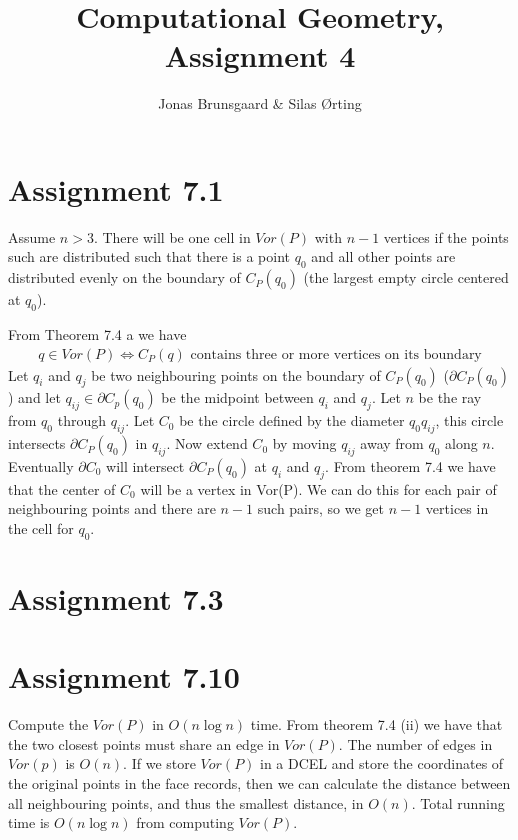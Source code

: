 \documentclass[10pt,a4paper,final,oneside,openany,article,oldfontcommands]{memoir}
\title{Computational Geometry, Assignment 4}
\author{
    Jonas Brunsgaard \& Silas Ørting
}
\begin{document}
\maketitle


\chapter*{Assignment 7.1}
Assume $n > 3$. There will be one cell in $Vor(P)$ with $n-1$ vertices if the points such are distributed such that there is a point $q_0$ and all other points are distributed evenly on the boundary of $C_P(q_0)$ (the largest empty circle centered at $q_0$).

From Theorem 7.4 a we have
\begin{align*}
  q \in Vor(P) \iff C_P(q) \text{ contains three or more vertices on its boundary}
\end{align*}
Let $q_i$ and $q_j$ be two neighbouring points on the boundary of $C_P(q_0)$ ($\partial C_P(q_0)$) and let $q_{ij} \in \partial C_p(q_0)$ be the midpoint between $q_i$ and $q_j$. Let $n$ be the ray from $q_0$ through $q_{ij}$. Let $C_0$ be the circle defined by the diameter $q_0q_{ij}$, this circle intersects $\partial C_P(q_0)$ in $q_{ij}$. Now extend $C_0$ by moving $q_{ij}$ away from $q_0$ along $n$. Eventually $\partial C_0$ will intersect $\partial C_P(q_0)$ at $q_i$ and $q_j$. From theorem 7.4 we have that the center of $C_0$ will be a vertex in Vor(P). We can do this for each pair of neighbouring points and there are $n-1$ such pairs, so we get $n-1$ vertices in the cell for $q_0$.

\chapter*{Assignment 7.3}


\chapter*{Assignment 7.10}
Compute the $Vor(P)$ in $O(n \log n)$ time. From theorem 7.4 (ii) we have that the two closest points must share an edge in $Vor(P)$. The number of edges in $Vor(p)$ is $O(n)$. If we store $Vor(P)$ in a DCEL and store the coordinates of the original points in the face records, then we can calculate the distance between all neighbouring points, and thus the smallest distance, in $O(n)$. Total running time is $O(n \log n)$ from computing $Vor(P)$.
\end{document}
